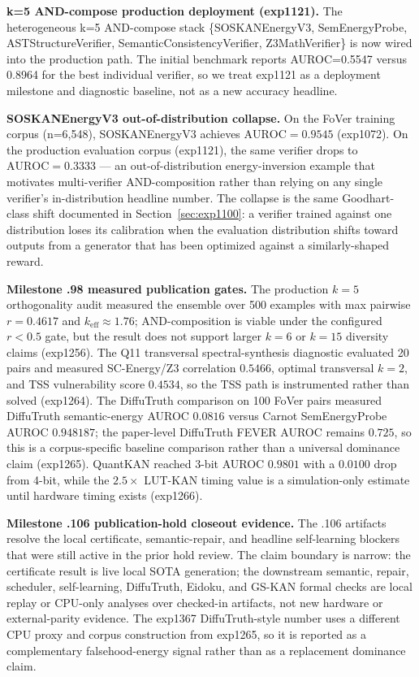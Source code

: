 \documentclass[10pt]{article}
\begin{document}
\textbf{k=5 AND-compose production deployment (exp1121).}
The heterogeneous k=5 AND-compose stack
\{SOSKANEnergyV3, SemEnergyProbe, ASTStructureVerifier,
SemanticConsistencyVerifier, Z3MathVerifier\} is now wired into the
production path. The initial benchmark reports AUROC=0.5547 versus
0.8964 for the best individual verifier, so we treat exp1121 as a
deployment milestone and diagnostic baseline, not as a new accuracy
headline.

\textbf{SOSKANEnergyV3 out-of-distribution collapse.}
On the FoVer training corpus (n=6{,}548), SOSKANEnergyV3 achieves
$\mathrm{AUROC}=0.9545$ (exp1072). On the production evaluation
corpus (exp1121), the same verifier drops to
$\mathrm{AUROC}=0.3333$ --- an out-of-distribution energy-inversion
example that motivates multi-verifier AND-composition rather than
relying on any single verifier's in-distribution headline number.
The collapse is the same Goodhart-class shift documented in
Section~\ref{sec:exp1100}: a verifier trained against one
distribution loses its calibration when the evaluation distribution
shifts toward outputs from a generator that has been optimized
against a similarly-shaped reward.

\textbf{Milestone .98 measured publication gates.}
The production $k=5$ orthogonality audit measured the ensemble over
500 examples with max pairwise $r=0.4617$ and
$k_{\text{eff}} \approx 1.76$; AND-composition is viable under the
configured $r < 0.5$ gate, but the result does not support larger
$k=6$ or $k=15$ diversity claims (exp1256). The Q11 transversal
spectral-synthesis diagnostic evaluated 20 pairs and measured
SC-Energy/Z3 correlation $0.5466$, optimal transversal $k=2$, and
TSS vulnerability score $0.4534$, so the TSS path is instrumented
rather than solved (exp1264). The DiffuTruth comparison on 100
FoVer pairs measured DiffuTruth semantic-energy AUROC $0.0816$
versus Carnot SemEnergyProbe AUROC $0.948187$; the paper-level
DiffuTruth FEVER AUROC remains $0.725$, so this is a corpus-specific
baseline comparison rather than a universal dominance claim
(exp1265). QuantKAN reached 3-bit AUROC $0.9801$ with a $0.0100$
drop from 4-bit, while the $2.5\times$ LUT-KAN timing value is a
simulation-only estimate until hardware timing exists (exp1266).

\textbf{Milestone .106 publication-hold closeout evidence.}
The .106 artifacts resolve the local certificate, semantic-repair,
and headline self-learning blockers that were still active in the
prior hold review. The claim boundary is narrow: the certificate
result is live local SOTA generation; the downstream semantic,
repair, scheduler, self-learning, DiffuTruth, Eidoku, and GS-KAN
formal checks are local replay or CPU-only analyses over checked-in
artifacts, not new hardware or external-parity evidence.
The exp1367 DiffuTruth-style number uses a different CPU proxy and
corpus construction from exp1265, so it is reported as a
complementary falsehood-energy signal rather than as a replacement
dominance claim.
\end{document}
